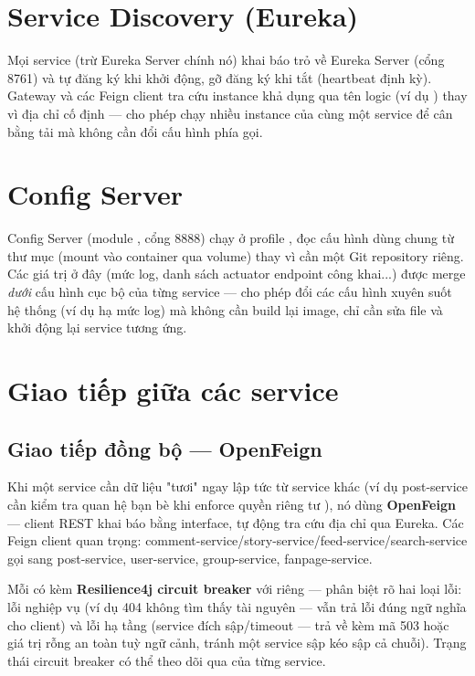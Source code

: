 \documentclass[12pt,a4paper]{report}
\begin{document}
\section{Service Discovery (Eureka)}

Mọi service (trừ Eureka Server chính nó) khai báo  trỏ về Eureka Server (cổng 8761) và tự đăng ký khi
khởi động, gỡ đăng ký khi tắt (heartbeat định kỳ). Gateway và các Feign client
tra cứu instance khả dụng qua tên logic (ví dụ ) thay
vì địa chỉ cố định — cho phép chạy nhiều instance của cùng một service để cân
bằng tải mà không cần đổi cấu hình phía gọi.

\section{Config Server}

Config Server (module , cổng 8888) chạy ở profile
, đọc cấu hình dùng chung từ thư mục  (mount vào container qua volume) thay vì cần một Git
repository riêng. Các giá trị ở đây (mức log, danh sách actuator endpoint công
khai...) được merge \emph{dưới} cấu hình cục bộ của từng service — cho phép
đổi các cấu hình xuyên suốt hệ thống (ví dụ hạ mức log) mà không cần build lại
image, chỉ cần sửa file và khởi động lại service tương ứng.

\section{Giao tiếp giữa các service}

\subsection{Giao tiếp đồng bộ — OpenFeign}

Khi một service cần dữ liệu "tươi" ngay lập tức từ service khác (ví dụ
post-service cần kiểm tra quan hệ bạn bè khi enforce quyền riêng tư
), nó dùng \textbf{OpenFeign} — client REST khai báo bằng
interface, tự động tra cứu địa chỉ qua Eureka. Các Feign client quan trọng:
comment-service/story-service/feed-service/search-service gọi sang
post-service, user-service, group-service, fanpage-service.

Mỗi  có kèm \textbf{Resilience4j circuit breaker} với
 riêng — phân biệt rõ hai loại lỗi: lỗi nghiệp vụ (ví dụ
404 không tìm thấy tài nguyên — vẫn trả lỗi đúng ngữ nghĩa cho client) và lỗi
hạ tầng (service đích sập/timeout — trả về 
kèm mã 503 hoặc giá trị rỗng an toàn tuỳ ngữ cảnh, tránh một service sập kéo
sập cả chuỗi). Trạng thái circuit breaker có thể theo dõi qua
 của từng service.
\end{document}
